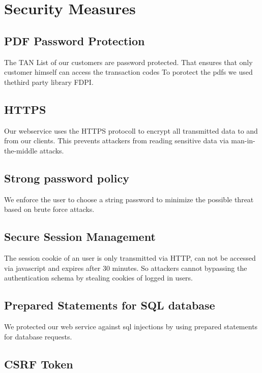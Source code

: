 \chapter{Security Measures}

\section{PDF Password Protection}
The TAN List of our customers are password protected. That ensures that only customer himself can access the transaction codes To porotect the pdfs we used thethird party library FDPI.
\section{HTTPS}
Our webservice uses the HTTPS protocoll to encrypt all transmitted data to and from our clients.
This prevents attackers from reading sensitive data via man-in-the-middle attacks.
\section{Strong password policy}
We enforce the user to choose a string password to minimize the possible threat based on brute force attacks.
\section{Secure Session Management}
The session cookie of an user is only transmitted via HTTP, can not be accessed via javascript and expires after 30 minutes. So attackers cannot bypassing the authentication schema by stealing cookies of logged in users.
\section{Prepared Statements for SQL database}
We protected our web service against sql injections by using prepared statements for database requests.
\section{CSRF Token}


